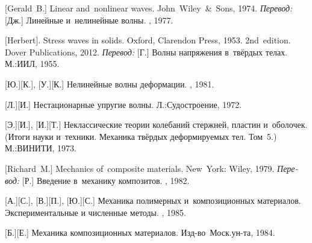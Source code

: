 \begin{thebibliography}{123}
\begin{otherlanguage}{russian}
[Gerald~B.] Linear and~nonlinear waves. John~Wiley~\&~Sons, 1974. 
\emph{Перевод:} [Дж.] Линейные и~нелинейные волны. \mirpublisher, 1977. 

[Herbert]. Stress waves in solids. Oxford, Clarendon Press, 1953.  2nd~edition. Dover Publications, 2012. 
\emph{Перевод:} [Г.] Волны напряжения в~твёрдых телах. М.:\;ИИЛ, 1955. 

[Ю.][К.], [У.][К.] Нелинейные волны деформации. \naukapublisher, 1981. 

[Л.][И.] Нестационарные упругие волны. Л.:\;Судостроение, 1972. 

[Э.][И.], [И.][Т.] Неклассические теории колебаний стержней, пластин и~оболочек. (Итоги науки и~техники. Механика твёрдых деформируемых тел. Том~5.) М.:\;ВИНИТИ, 1973. 

%
%



[Richard~M.] Mechanics of~composite materials. New~York: Wiley, 1979. 
\emph{Перевод:} [Р.] Введение в~механику композитов. \mirpublisher, 1982. 

[А.][С.], [В.][П.], [Ю.][С.] Механика полимерных и~композиционных материалов. Экспериментальные и численные методы. \naukapublisher, 1985. 

[Б.][Е.] Механика композиционных материалов. Изд\hbox{-}во~Моск.\:ун\hbox{-}та, 1984. 


\end{otherlanguage}
\end{thebibliography}
